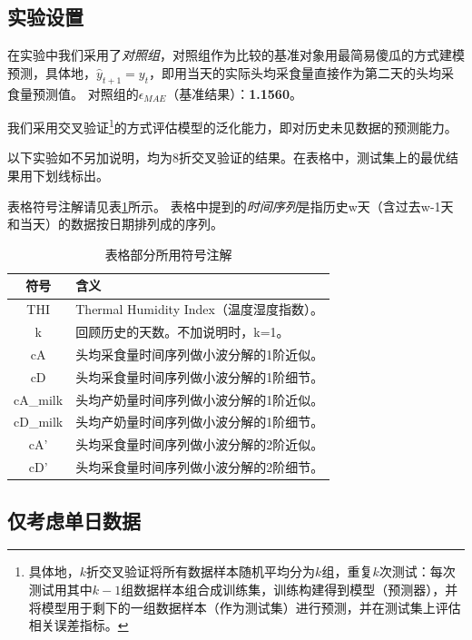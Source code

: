 \subsection{实验设置}

在实验中我们采用了\emph{对照组}，对照组作为比较的基准对象用最简易傻瓜的方式建模预测，具体地，$\hat y_{t+1} = y_t$，即用当天的实际头均采食量直接作为第二天的头均采食量预测值。
对照组的$\epsilon_{MAE}$（基准结果）：\textbf{1.1560}。

我们采用交叉验证\footnote{具体地，$k$折交叉验证将所有数据样本随机平均分为$k$组，重复$k$次测试：每次测试用其中$k-1$组数据样本组合成训练集，训练构建得到模型（预测器），并将模型用于剩下的一组数据样本（作为测试集）进行预测，并在测试集上评估相关误差指标。}的方式评估模型的泛化能力，即对历史未见数据的预测能力。

以下实验如不另加说明，均为8折交叉验证的结果。在表格中，测试集上的最优结果用下划线标出。


表格符号注解请见表\ref{table_notation}所示。
表格中提到的\emph{时间序列}是指历史w天（含过去w-1天和当天）的数据按日期排列成的序列。

\begin{table}
\caption{表格部分所用符号注解}
\label{table_notation}
\footnotesize
\begin{center}
\begin{tabular}{|c|p{5.6cm}|}
\hline
\textbf{符号} & \textbf{含义} \\
\hline
    THI & Thermal Humidity Index（温度湿度指数）。 \\
    k & 回顾历史的天数。不加说明时，k=1。  \\
    cA & 头均采食量时间序列做小波分解的1阶近似。 \\
    cD & 头均采食量时间序列做小波分解的1阶细节。 \\
    cA\_milk & 头均产奶量时间序列做小波分解的1阶近似。 \\
    cD\_milk & 头均产奶量时间序列做小波分解的1阶细节。 \\
    cA' & 头均采食量时间序列做小波分解的2阶近似。 \\
    cD' & 头均采食量时间序列做小波分解的2阶细节。 \\
\hline
\end{tabular}
\end{center}
\end{table}%


\subsection{仅考虑单日数据}

